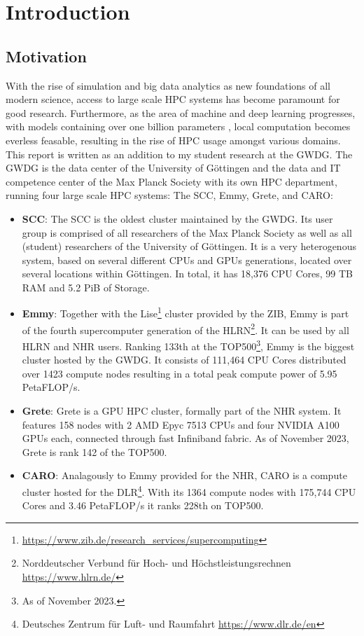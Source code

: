 \section{Introduction}
\subsection{Motivation}
With the rise of simulation and big data analytics as new foundations of all modern science,
access to large scale \ac{HPC} systems has become paramount for good research. Furthermore,
as the area of machine and deep learning progresses, with models containing over one billion
parameters \cite{gpt4param},  local computation becomes everless feasable, resulting in the 
rise of \ac{HPC} usage amongst various domains.\\

This report is written as an addition to my student research at the \ac{GWDG}. The \ac{GWDG} is the
data center of the University of Göttingen and the data and IT competence center of the 
Max Planck Society with its own \ac{HPC} department, running four large scale \ac{HPC} systems:
The \ac{SCC}, Emmy, Grete, and CARO:
\begin{itemize}
\item \textbf{\ac{SCC}}\cite{SCC}: The \ac{SCC} is the oldest cluster maintained 
by the \ac{GWDG}. Its user group is comprised of all researchers of the Max Planck Society as 
well as all (student) researchers of the University of Göttingen. It is a very heterogenous system,
based on several different CPUs and GPUs generations, located over several locations within 
Göttingen. In total, it has 18,376 CPU Cores, 99 TB RAM and 5.2 PiB of Storage.
\item \textbf{Emmy}\cite{Emmy}: Together with the Lise\footnote{
\url{https://www.zib.de/research_services/supercomputing}} cluster provided by the ZIB, Emmy is 
part of  the fourth supercomputer generation of the HLRN\footnote{Norddeutscher Verbund für Hoch- 
und Höchstleistungsrechnen \url{https://www.hlrn.de/}}. It can be used by all HLRN and NHR users.
Ranking 133th at the TOP500\footnote{As of November 2023.}, Emmy is the biggest cluster hosted by
the \ac{GWDG}. It consists of 111,464 CPU Cores distributed over 1423 compute nodes resulting 
in a total peak compute power of 5.95 PetaFLOP/s.
\item \textbf{Grete}: Grete is a GPU \ac{HPC} cluster, formally part of the NHR system.
It features 158 nodes with 2 AMD Epyc 7513 CPUs and four NVIDIA A100 GPUs each, connected through fast
Infiniband fabric. As of November 2023, Grete is rank 142 of the TOP500.
\item \textbf{CARO}\cite{CARO}: Analagously to Emmy provided for the NHR, CARO is a compute cluster
hosted for the DLR\footnote{Deutsches Zentrum für Luft- und Raumfahrt \url{https://www.dlr.de/en}}.
With its 1364 compute nodes with 175,744 CPU Cores and 3.46 PetaFLOP/s it ranks 228th on TOP500.
\end{itemize}

